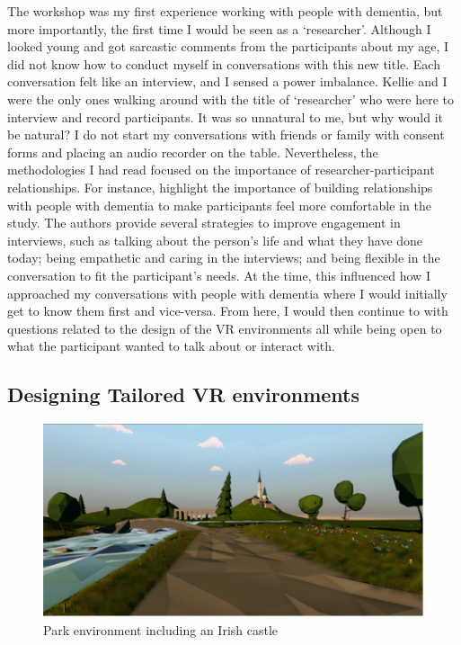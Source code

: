 The workshop was my first experience working with people with dementia, but more importantly, the first time I would be seen as a `researcher'. Although I looked young and got sarcastic comments from the participants about my age, I did not know how to conduct myself in conversations with this new title. Each conversation felt like an interview, and I sensed a power imbalance. Kellie and I were the only ones walking around with the title of `researcher' who were here to interview and record participants. It was so unnatural to me, but why would it be natural? I do not start my conversations with friends or family with consent forms and placing an audio recorder on the table. Nevertheless, the methodologies I had read focused on the importance of researcher-participant relationships. For instance, \cite{mckillop2004make} highlight the importance of building relationships with people with dementia to make participants feel more comfortable in the study. The authors provide several strategies to improve engagement in interviews, such as talking about the person's life and what they have done today; being empathetic and caring in the interviews; and being flexible in the conversation to fit the participant's needs. At the time, this influenced how I approached my conversations with people with dementia where I would initially get to know them first and vice-versa. From here, I would then continue to with questions related to the design of the VR environments all while being open to what the participant wanted to talk about or interact with.

\subsection{Designing Tailored VR environments}
\label{S1:VREnvrionments}

\begin{figure}
\centering
\includegraphics[width=.8\linewidth]{Images/ChapterFour/IrishCastlVR.png}
\caption{Park environment including an Irish castle}
\label{fig:IrishCastle}
\end{figure}

